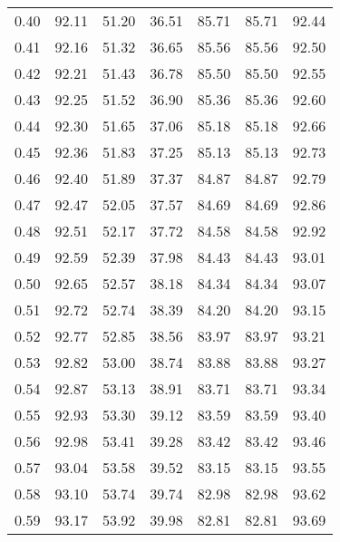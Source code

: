 \begin{tabular}{|c|c|c|c|c|c|c|}
      0.40 &     92.11 &     51.20 &      36.51 &   85.71 &      85.71 &         92.44 \\
      0.41 &     92.16 &     51.32 &      36.65 &   85.56 &      85.56 &         92.50 \\
      0.42 &     92.21 &     51.43 &      36.78 &   85.50 &      85.50 &         92.55 \\
      0.43 &     92.25 &     51.52 &      36.90 &   85.36 &      85.36 &         92.60 \\
      0.44 &     92.30 &     51.65 &      37.06 &   85.18 &      85.18 &         92.66 \\
      0.45 &     92.36 &     51.83 &      37.25 &   85.13 &      85.13 &         92.73 \\
      0.46 &     92.40 &     51.89 &      37.37 &   84.87 &      84.87 &         92.79 \\
      0.47 &     92.47 &     52.05 &      37.57 &   84.69 &      84.69 &         92.86 \\
      0.48 &     92.51 &     52.17 &      37.72 &   84.58 &      84.58 &         92.92 \\
      0.49 &     92.59 &     52.39 &      37.98 &   84.43 &      84.43 &         93.01 \\
      0.50 &     92.65 &     52.57 &      38.18 &   84.34 &      84.34 &         93.07 \\
      0.51 &     92.72 &     52.74 &      38.39 &   84.20 &      84.20 &         93.15 \\
      0.52 &     92.77 &     52.85 &      38.56 &   83.97 &      83.97 &         93.21 \\
      0.53 &     92.82 &     53.00 &      38.74 &   83.88 &      83.88 &         93.27 \\
      0.54 &     92.87 &     53.13 &      38.91 &   83.71 &      83.71 &         93.34 \\
      0.55 &     92.93 &     53.30 &      39.12 &   83.59 &      83.59 &         93.40 \\
      0.56 &     92.98 &     53.41 &      39.28 &   83.42 &      83.42 &         93.46 \\
      0.57 &     93.04 &     53.58 &      39.52 &   83.15 &      83.15 &         93.55 \\
      0.58 &     93.10 &     53.74 &      39.74 &   82.98 &      82.98 &         93.62 \\
      0.59 &     93.17 &     53.92 &      39.98 &   82.81 &      82.81 &         93.69 \\

\end{tabular}
